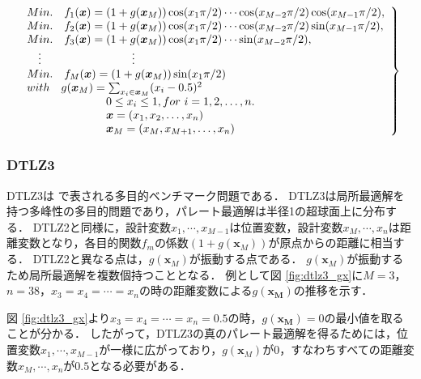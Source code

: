 \documentclass[../main/main]{subfiles}
\begin{document}
\begin{eqnarray} 
\left.
\begin{array}{ll}
Min. \quad f_{1} (\bm{x}) = (1+g(\bm{x}_{M}))\cos(x_{1}\pi/2)  \cdots  \cos(x_{M-2}\pi/2)\cos(x_{M-1}\pi/2),\\
Min. \quad f_{2} (\bm{x}) = (1+g(\bm{x}_{M}))\cos(x_{1}\pi/2)  \cdots  \cos(x_{M-2}\pi/2)\sin(x_{M-1}\pi/2), \\
Min. \quad f_{3} (\bm{x}) = (1+g(\bm{x}_{M}))\cos(x_{1}\pi/2)  \cdots  \sin(x_{M-2}\pi/2), \\
     \  \  \ $\vdots$    \qquad     \qquad      \qquad     \qquad \vdots \\
Min. \quad f_{M}(\bm{x}) = (1+g(\bm{x}_{M}))\sin(x_{1}\pi/2)\\
with \quad g(\bm{x}_{M}) = \sum_{x_i \in \bm{x}_M} (x_i - 0.5)^2  \\
   \qquad    \qquad    \qquad  \quad      0 \le x_{i} \le 1,  for \ i = 1, 2, \ldots, n. \\
   \qquad    \qquad    \qquad  \quad        \bm x = (x_1,x_2, \ldots, x_n)\\
   \qquad    \qquad    \qquad  \quad        \bm{x}_M = (x_M,x_{M+1}, \ldots, x_n)
   \label{dtlz2} 
\end{array}
\right\}
\end{eqnarray}

\subsubsection{DTLZ3}
DTLZ3は  で表される多目的ベンチマーク問題である．
DTLZ3は局所最適解を持つ多峰性の多目的問題であり，パレート最適解は半径1の超球面上に分布する．
DTLZ2と同様に，設計変数$x_1,\cdots,x_{M-1}$は位置変数，設計変数$x_M,\cdots,x_n$は距離変数となり，各目的関数$f_m$の係数$(1+g(\bm{x}_M))$が原点からの距離に相当する．
DTLZ2と異なる点は，$g(\bm{x}_M)$が振動する点である．
$g(\bm{x}_M)$が振動するため局所最適解を複数個持つこととなる．
例として図  \ref{fig:dtlz3_gx}に$M=3$，$n=38$，$x_3=x_4= \cdots =x_n$の時の距離変数による$g(\bm{x_M})$の推移を示す．

図 \ref{fig:dtlz3_gx}より$x_3=x_4= \cdots =x_n=0.5$の時，$g(\bm{x_M})=0$の最小値を取ることが分かる．
したがって，DTLZ3の真のパレート最適解を得るためには，位置変数$x_1,\cdots,x_{M-1}$が一様に広がっており，$g(\bm{x}_M)$が$0$，すなわちすべての距離変数$x_M,\cdots,x_n$が$0.5$となる必要がある．
\end{document}
